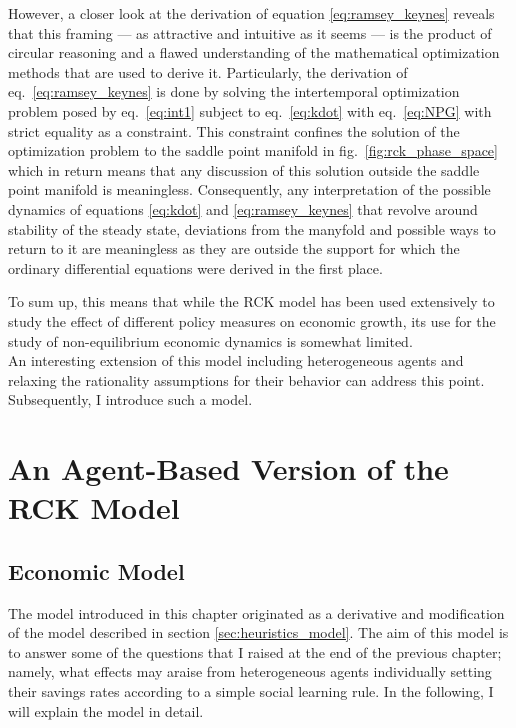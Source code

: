 However, a closer look at the derivation of equation \eqref{eq:ramsey_keynes} reveals that this framing --- as attractive and intuitive as it seems --- is the product of circular reasoning and a flawed understanding of the mathematical optimization methods that are used to derive it. Particularly, the derivation of eq.~\eqref{eq:ramsey_keynes} is done by solving the intertemporal optimization problem posed by eq.~\eqref{eq:int1} subject to eq.~\eqref{eq:kdot} with eq.~\eqref{eq:NPG} with strict equality as a constraint. This constraint confines the solution of the optimization problem to the saddle point manifold in fig.~\ref{fig:rck_phase_space} which in return means that any discussion of this solution outside the saddle point manifold is meaningless. Consequently, any interpretation of the possible dynamics of equations \eqref{eq:kdot} and \eqref{eq:ramsey_keynes} that revolve around stability of the steady state, deviations from the manyfold and possible ways to return to it are meaningless as they are outside the support for which the ordinary differential equations were derived in the first place.

To sum up, this means that while the RCK model has been used extensively to study the effect of different policy measures on economic growth, its use for the study of non-equilibrium economic dynamics is somewhat limited. \\

An interesting extension of this model including heterogeneous agents and relaxing the rationality assumptions for their behavior can address this point. Subsequently, I introduce such a model.




\section{An Agent-Based Version of the RCK Model}
\label{sec:savings_model}
\subsection{Economic Model}
The model introduced in this chapter originated as a derivative and modification of the model described in section \ref{sec:heuristics_model}. The aim of this model is to answer some of the questions that I raised at the end of the previous chapter; namely, what effects may araise from heterogeneous agents individually setting their savings rates according to a simple social learning rule. In the following, I will explain the model in detail.\\


